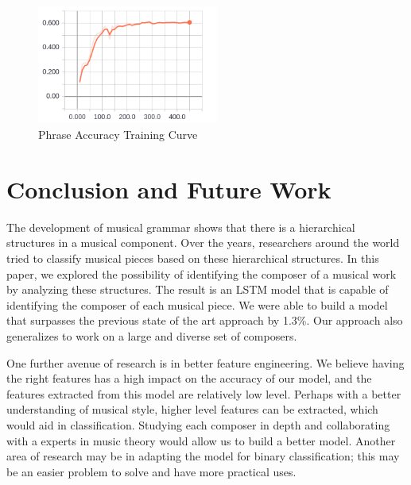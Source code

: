 \documentclass[11pt,a4paper]{article}
\begin{document}
\begin{figure}[h]
\caption{Phrase Accuracy Training Curve}
\centering
\includegraphics[width=0.53\textwidth]{phrase_acc.png}
\end{figure}


\section{Conclusion and Future Work}

The development of musical grammar shows that there is a hierarchical structures in a musical component. Over the years, researchers around the world tried to classify musical pieces based on these hierarchical structures. In this paper, we explored the possibility of identifying the composer of a musical work by analyzing these structures. The result is an LSTM model that is capable of identifying the composer of each musical piece. We were able to build a model that surpasses the previous state of the art approach by 1.3\%. Our approach also generalizes to work on a large and diverse set of composers.

One further avenue of research is in better feature engineering. We believe having the right features has a high impact on the accuracy of our model, and the features extracted from this model are relatively low level. Perhaps with a better understanding of musical style, higher level features can be extracted, which would aid in classification. Studying each composer in depth and collaborating with a experts in music theory would allow us to build a better model. Another area of research may be in adapting the model for binary classification; this may be an easier problem to solve and have more practical uses.





\end{document}

